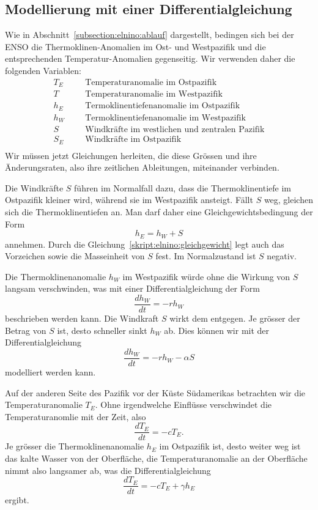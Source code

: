 \subsection{Modellierung mit einer Differentialgleichung%
\label{subsection:elnino:modellierung}}
Wie in Abschnitt~\ref{subsection:elnino:ablauf} dargestellt, bedingen sich
bei der ENSO die Thermoklinen-Anomalien im Ost- und Westpazifik und die
entsprechenden Temperatur-Anomalien gegenseitig.
Wir verwenden daher die folgenden Variablen:
\[
\begin{aligned}
T_E&&&\text{Temperaturanomalie im Ostpazifik}\\
T&&&\text{Temperaturanomalie im Westpazifik}\\
h_E&&&\text{Termoklinentiefenanomalie im Ostpazifik}\\
h_W&&&\text{Termoklinentiefenanomalie im Westpazifik}\\
S&&&\text{Windkräfte im westlichen und zentralen Pazifik}\\
S_E&&&\text{Windkräfte im Ostpazifik}\\
\end{aligned}
\]
Wir müssen jetzt Gleichungen herleiten, die diese Grössen und ihre
Änderungsraten, also ihre zeitlichen Ableitungen, miteinander verbinden.

Die Windkräfte $S$ führen im Normalfall dazu, dass die Thermoklinentiefe
im Ostpazifik kleiner wird, während sie im Westpazifik ansteigt.
Fällt $S$ weg, gleichen sich die Thermoklinentiefen an.
Man darf daher eine Gleichgewichtsbedingung der Form
\begin{equation}
h_E = h_W + S
\label{skript:elnino:gleichgewicht}
\end{equation}
annehmen.
Durch die Gleichung~\ref{skript:elnino:gleichgewicht} legt auch
das Vorzeichen sowie die Masseinheit von $S$ fest.
Im Normalzustand ist $S$ negativ.

Die Thermoklinenanomalie $h_W$ im Westpazifik würde ohne die Wirkung
von $S$ langsam verschwinden, was mit einer Differentialgleichung
der Form
\[
\frac{dh_W}{dt} = -rh_W
\]
beschrieben werden kann.
Die Windkraft $S$ wirkt dem entgegen.
Je grösser der Betrag von $S$ ist, desto schneller sinkt $h_W$ ab.
Dies können wir mit der Differentialgleichung
\begin{equation}
\frac{dh_W}{dt}
=
-rh_W -\alpha S
\end{equation}
modelliert werden kann.

Auf der anderen Seite des Pazifik vor der Küste Südamerikas
betrachten wir die Temperaturanomalie
$T_E$.
Ohne irgendwelche Einflüsse verschwindet die Temperaturanomlie mit der
Zeit, also
\[
\frac{dT_E}{dt} = -cT_E.
\]
Je grösser die Thermoklinenanomalie $h_E$ im Ostpazifik ist, desto weiter
weg ist das kalte Wasser von der Oberfläche, die Temperaturanomalie an
der Oberfläche nimmt also langsamer ab, was die Differentialgleichung
\begin{equation}
\frac{dT_E}{dt} = -cT_E + \gamma h_E
\end{equation}
ergibt.

